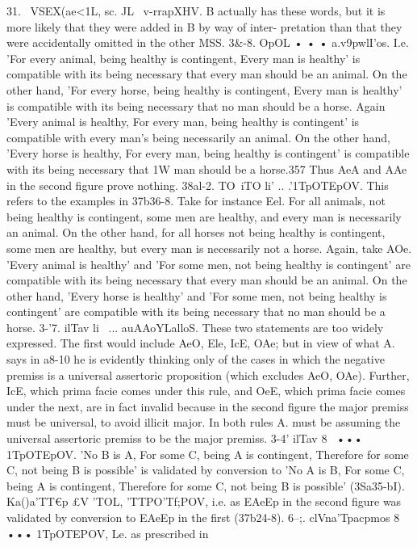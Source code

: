 {{{{{{{{{31. ~VSEX(ae<1L, sc. JL~ v-rrapXHV. B actually has these words,
but it is more likely that they were added in B by way of inter-
pretation than that they were accidentally omitted in the other
MSS.
3&-8. OpOL • • • a.v9pwlI'os. I.e. 'For every animal, being
healthy is contingent, Every man is healthy' is compatible with
its being necessary that every man should be an animal. On the
other hand, 'For every horse, being healthy is contingent, Every
man is healthy' is compatible with its being necessary that no
man should be a horse.
Again 'Every animal is healthy, For every man, being healthy
is contingent' is compatible with every man's being necessarily
an animal. On the other hand, 'Every horse is healthy, For
every man, being healthy is contingent' is compatible with its
being necessary that 1W man should be a horse.357
Thus AeA and AAe in the second figure prove nothing.
38al-2. TO~iTO li' .. .'1TpOTEpOV. This refers to the examples in
37b36-8. Take for instance Eel. For all animals, not being healthy
is contingent, some men are healthy, and every man is necessarily
an animal. On the other hand, for all horses not being healthy is
contingent, some men are healthy, but every man is necessarily
not a horse.
Again, take AOe. 'Every animal is healthy' and 'For some men,
not being healthy is contingent' are compatible with its being
necessary that every man should be an animal. On the other
hand, 'Every horse is healthy' and 'For some men, not being
healthy is contingent' are compatible with its being necessary
that no man should be a horse.
3-'7. ilTav li~ ... auAAoYLalloS. These two statements are too
widely expressed. The first would include AeO, Ele, IcE, OAe;
but in view of what A. says in a8-10 he is evidently thinking only
of the cases in which the negative premiss is a universal assertoric
proposition (which excludes AeO, OAe). Further, IcE, which
prima facie comes under this rule, and OeE, which prima facie
comes under the next, are in fact invalid because in the second
figure the major premiss must be universal, to avoid illicit major.
In both rules A. must be assuming the universal assertoric premiss
to be the major premiss.
3-4' ilTav 8~ ••• 1TpOTEpOV. 'No B is A, For some C, being A
is contingent, Therefore for some C, not being B is possible' is
validated by conversion to 'No A is B, For some C, being A is
contingent, Therefore for some C, not being B is possible'
(3Sa35-bI). Ka()a'TT€p £V 'TOL, 'TTPO'Tf;POV, i.e. as EAeEp in the second
figure was validated by conversion to EAeEp in the first (37b24-8).
6--;. clVna'Tpacpmos 8~ ••• 1TpOTEPOV, Le. as prescribed in
}}}}}}}}}
